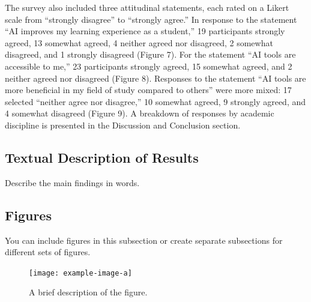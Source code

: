 \documentclass[12pt]{article}
\begin{document}
The survey also included three attitudinal statements, each rated on a Likert scale from “strongly disagree” to “strongly agree.” In response to the statement “AI improves my learning experience as a student,” 19 participants strongly agreed, 13 somewhat agreed, 4 neither agreed nor disagreed, 2 somewhat disagreed, and 1 strongly disagreed (Figure 7). For the statement “AI tools are accessible to me,” 23 participants strongly agreed, 15 somewhat agreed, and 2 neither agreed nor disagreed (Figure 8). Responses to the statement “AI tools are more beneficial in my field of study compared to others” were more mixed: 17 selected “neither agree nor disagree,” 10 somewhat agreed, 9 strongly agreed, and 4 somewhat disagreed (Figure 9). A breakdown of responses by academic discipline is presented in the Discussion and Conclusion section.


\subsection{Textual Description of Results}
Describe the main findings in words.

\subsection{Figures}
\label{subsec:figures}
You can include figures in this subsection or create separate subsections for different sets of figures.

\begin{figure}[htbp]
  \centering
  \texttt{[image: example-image-a]} %
  \caption{A brief description of the figure.}
  \label{fig:example1}
\end{figure}
\end{document}
